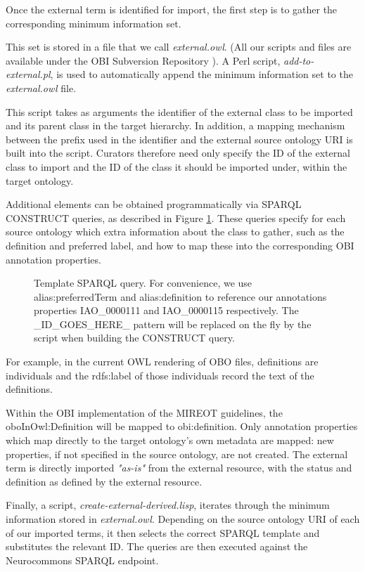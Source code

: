 \documentclass{ao2e}%
\begin{document}
Once the external term is identified for import, the first step is to gather the corresponding minimum information set.

This set is stored in a file that we call \emph{external.owl}. (All our scripts and files are available under the \ac{OBI} Subversion Repository \cite{OBIScripts}).
A Perl script, \emph{add-to-external.pl}, is used to automatically append the minimum information set to the \emph{external.owl} file. 

This script takes as arguments the identifier of the external class to be imported and its parent class in the target hierarchy.
In addition, a mapping mechanism between the prefix used in the identifier and the external source ontology URI is built into the script.
Curators therefore need only specify the ID of the external class to import and the ID of the class it should be imported under, within the target ontology.


Additional elements can be obtained programmatically via SPARQL\cite{SPARQL} CONSTRUCT queries, as described in Figure \ref{fig:sparql}.
These queries\cite{OBIQueries} specify for each source ontology which extra information about the class to gather, such as the definition and preferred label, and how to map these into the corresponding OBI annotation properties. 

\begin{figure}[t]
\scriptsize
 
\caption{Template SPARQL query. For convenience, we use alias:preferredTerm and
alias:definition to reference our annotations properties IAO\_0000111 and IAO\_0000115 \cite{IAO} respectively. The \_ID\_GOES\_HERE\_ pattern will be replaced on the fly by the script when building the CONSTRUCT query.}
\label{fig:sparql}
\end{figure}


For example, in the current \ac{OWL} rendering of \ac{OBO} files, definitions are individuals and the rdfs:label of those individuals record the text of the definitions. 

Within the \ac{OBI} implementation of the \ac{MIREOT} guidelines, the oboInOwl:Definition will be mapped to obi:definition. Only annotation properties which map directly to the target ontology's own metadata are mapped: new properties, if not specified in the source ontology, are not created. The external term is directly imported \emph{"as-is"} from the external resource, with the status and definition as defined by the external resource.

Finally, a script, \emph{create-external-derived.lisp}, iterates through the minimum information stored in \emph{external.owl}.
Depending on the source ontology URI of each of our imported terms, it then selects the correct SPARQL template and substitutes the relevant ID.
The queries are then executed against the Neurocommons SPARQL endpoint\cite{Neurocommons}.
\end{document}
